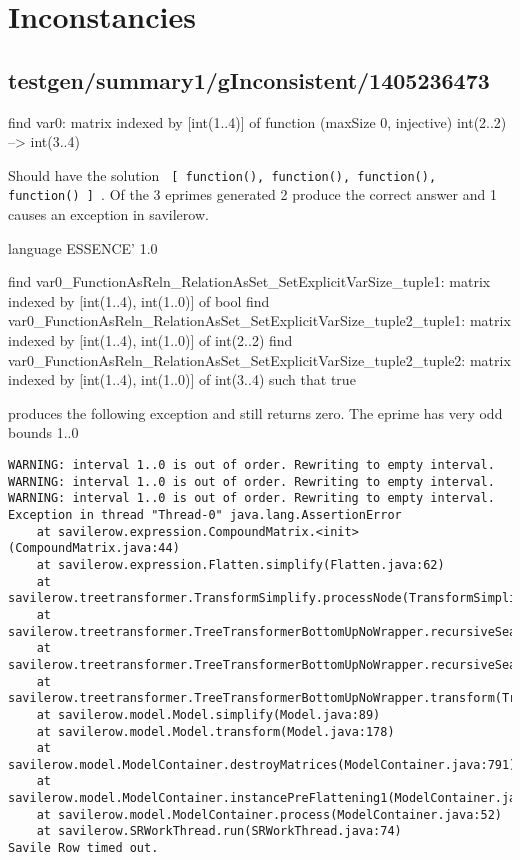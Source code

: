 \section{Inconstancies}

\subsection{testgen/summary1/gInconsistent/1405236473}

\begin{lst:essence}
find var0:
        matrix indexed by [int(1..4)] of function (maxSize 0, injective)
                                             int(2..2) --> int(3..4)
\end{lst:essence}

Should have the solution \lstinline! [ function(), function(), function(), function() ] !. Of the 3 eprimes generated 2 produce the correct answer and 1 causes an exception in savilerow.

\begin{lst:essence}[caption=0001.eprime]
language ESSENCE' 1.0

find var0_FunctionAsReln_RelationAsSet_SetExplicitVarSize_tuple1:
        matrix indexed by [int(1..4), int(1..0)] of bool
find var0_FunctionAsReln_RelationAsSet_SetExplicitVarSize_tuple2_tuple1:
        matrix indexed by [int(1..4), int(1..0)] of int(2..2)
find var0_FunctionAsReln_RelationAsSet_SetExplicitVarSize_tuple2_tuple2:
        matrix indexed by [int(1..4), int(1..0)] of int(3..4)
such that true
\end{lst:essence}

produces the following exception and still returns zero. The eprime has very odd bounds 1..0

\begin{lstlisting}
WARNING: interval 1..0 is out of order. Rewriting to empty interval.
WARNING: interval 1..0 is out of order. Rewriting to empty interval.
WARNING: interval 1..0 is out of order. Rewriting to empty interval.
Exception in thread "Thread-0" java.lang.AssertionError
	at savilerow.expression.CompoundMatrix.<init>(CompoundMatrix.java:44)
	at savilerow.expression.Flatten.simplify(Flatten.java:62)
	at savilerow.treetransformer.TransformSimplify.processNode(TransformSimplify.java:40)
	at savilerow.treetransformer.TreeTransformerBottomUpNoWrapper.recursiveSearch(TreeTransformerBottomUpNoWrapper.java:105)
	at savilerow.treetransformer.TreeTransformerBottomUpNoWrapper.recursiveSearch(TreeTransformerBottomUpNoWrapper.java:91)
	at savilerow.treetransformer.TreeTransformerBottomUpNoWrapper.transform(TreeTransformerBottomUpNoWrapper.java:63)
	at savilerow.model.Model.simplify(Model.java:89)
	at savilerow.model.Model.transform(Model.java:178)
	at savilerow.model.ModelContainer.destroyMatrices(ModelContainer.java:791)
	at savilerow.model.ModelContainer.instancePreFlattening1(ModelContainer.java:250)
	at savilerow.model.ModelContainer.process(ModelContainer.java:52)
	at savilerow.SRWorkThread.run(SRWorkThread.java:74)
Savile Row timed out.
\end{lstlisting}


